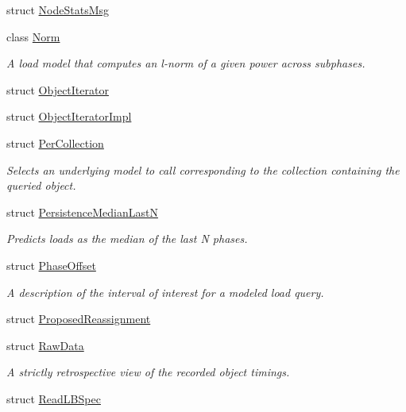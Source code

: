 \begin{DoxyCompactItemize}
struct \hyperlink{structvt_1_1vrt_1_1collection_1_1balance_1_1_node_stats_msg}{Node\+Stats\+Msg}
\item 
class \hyperlink{classvt_1_1vrt_1_1collection_1_1balance_1_1_norm}{Norm}
\begin{DoxyCompactList}\small\item\em A load model that computes an l-\/norm of a given power across subphases. \end{DoxyCompactList}\item 
struct \hyperlink{structvt_1_1vrt_1_1collection_1_1balance_1_1_object_iterator}{Object\+Iterator}
\item 
struct \hyperlink{structvt_1_1vrt_1_1collection_1_1balance_1_1_object_iterator_impl}{Object\+Iterator\+Impl}
\item 
struct \hyperlink{structvt_1_1vrt_1_1collection_1_1balance_1_1_per_collection}{Per\+Collection}
\begin{DoxyCompactList}\small\item\em Selects an underlying model to call corresponding to the collection containing the queried object. \end{DoxyCompactList}\item 
struct \hyperlink{structvt_1_1vrt_1_1collection_1_1balance_1_1_persistence_median_last_n}{Persistence\+Median\+LastN}
\begin{DoxyCompactList}\small\item\em Predicts loads as the median of the last N phases. \end{DoxyCompactList}\item 
struct \hyperlink{structvt_1_1vrt_1_1collection_1_1balance_1_1_phase_offset}{Phase\+Offset}
\begin{DoxyCompactList}\small\item\em A description of the interval of interest for a modeled load query. \end{DoxyCompactList}\item 
struct \hyperlink{structvt_1_1vrt_1_1collection_1_1balance_1_1_proposed_reassignment}{Proposed\+Reassignment}
\item 
struct \hyperlink{structvt_1_1vrt_1_1collection_1_1balance_1_1_raw_data}{Raw\+Data}
\begin{DoxyCompactList}\small\item\em A strictly retrospective view of the recorded object timings. \end{DoxyCompactList}\item 
struct \hyperlink{structvt_1_1vrt_1_1collection_1_1balance_1_1_read_l_b_spec}{Read\+L\+B\+Spec}

\end{DoxyCompactItemize}
